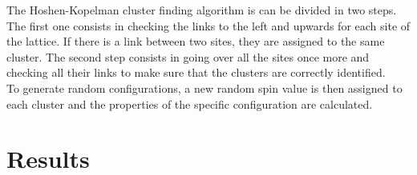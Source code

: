 \documentclass[twoside]{article}
\begin{document}
\begin{multicols}{2}
The Hoshen-Kopelman cluster finding algorithm is can be divided in two steps.
The first one consists in checking the links to the left and upwards for each site of the lattice. If there is a link between two sites, they are assigned to the same cluster. The second step consists in going over all the sites once more and checking all their links to make sure that the clusters are correctly identified. \\ To generate random configurations, a new random spin value is then assigned to each cluster and the properties of the specific configuration are calculated.

\section{Results}


\end{multicols}
\end{document}
